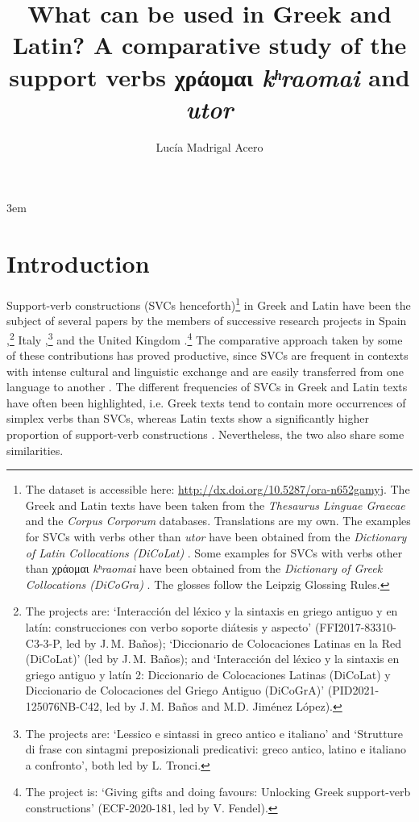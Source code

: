 \documentclass[output=paper,colorlinks,citecolor=brown]{langscibook}
\author{Lucía Madrigal Acero\affiliation{Universidad     Complutense de Madrid}}
\title[What can be used in Greek and Latin?]{What can be used in Greek and Latin? A comparative study of the support verbs χράομαι \textit{kʰraomai}   and \emph{utor}}
\begin{document}
\emergencystretch 3em
\maketitle

\section{Introduction}\label{sec:ma:1}

Support-verb constructions (SVCs henceforth)\footnote{The dataset is accessible here: \url{http://dx.doi.org/10.5287/ora-n652gamyj}. The Greek and Latin
  texts have been taken from the \emph{Thesaurus Linguae Graecae} and the \emph{Corpus Corporum} databases.
  Translations are my own. The examples for SVCs with verbs other than \emph{utor} have
  been obtained from the \emph{Dictionary of Latin Collocations (DiCoLat)}
  \parencite{banos_dicolat_nodate}. Some examples for SVCs with verbs other than χράομαι
  \emph{kʰraomai} have been obtained from the \emph{Dictionary of Greek
    Collocations (DiCoGra)} \parencite{jimenez_lopez_dicogra_nodate}. The glosses follow
  the Leipzig Glossing Rules.} in Greek and Latin have been the subject of
several papers by the members of successive research projects in Spain
\parencites{banos_bases_2018,jimenez_lopez_support_2016,jimenez_lopez__2021,jimenez_martinez_colocaciones_2019,mendozar_cruz_construcciones_2020,tur_aproximacion_2020,banos_latin_2022},\footnote{The projects are: `Interacción
  del léxico y la sintaxis en griego antiguo y en latín: construcciones con verbo soporte
  diátesis y aspecto' (FFI2017-83310-C3-3-P, led by J.\,M. Baños); `Diccionario de
  Colocaciones Latinas en la Red (DiCoLat)' (led by J.\,M. Baños); and `Interacción del
  léxico y la sintaxis en griego antiguo y latín 2: Diccionario de Colocaciones Latinas
  (DiCoLat) y Diccionario de Colocaciones del Griego Antiguo (DiCoGrA)'
  (PID2021-125076NB-C42, led by J.\,M. Baños and M.D. Jiménez López).} Italy
\parencites{tronci_at_2017,pompei_verbi_2019},\footnote{The projects are: `Lessico e sintassi in greco
  antico e italiano' and `Strutture di frase con sintagmi preposizionali predicativi:
  greco antico, latino e italiano a confronto', both led by L. Tronci.} and the United
Kingdom
\parencites{fendel_greek_2021,fendel_support-verb_2023,fendel_taking_2024}.\footnote{The project is: `Giving
  gifts and doing favours: Unlocking Greek support-verb constructions' (ECF-2020-181, led
  by V. Fendel).} The comparative approach taken by some of these contributions
\parencites{banos_arrepentirse_2017,banos_vota_2018,lopez_martin_colocaciones_2019} has
proved productive, since SVCs are frequent in contexts with intense cultural and
linguistic exchange and are easily transferred from one language to another
\parencites{bowern_diachrony_2008,fendel_greek_2021}. The different frequencies of SVCs in
Greek and Latin texts have often been highlighted, i.e. Greek texts tend to contain
more occurrences of simplex verbs than SVCs, whereas Latin texts show a significantly
higher proportion of support-verb constructions
\parencites[229]{banos_bellum_2015}[183]{jimenez_lopez_support_2016}. Nevertheless, the
two also share some similarities.
\end{document}
